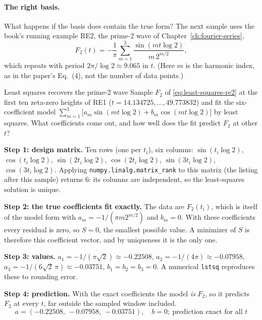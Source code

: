\paragraph{The right basis.} What happens if the basis does contain the true form? The next sample uses the book's running example RE2, the prime-2 wave of Chapter~\ref{ch:fourier-series},
\begin{equation}
F_2(t) = -\frac1\pi\sum_{m=1}^{3}\frac{\sin(mt\log2)}{m\,2^{m/2}} ,
\label{eq:least-squares-re2}
\end{equation}
which repeats with period $2\pi/\log 2\approx 9.065$ in $t$. (Here $m$ is the harmonic index, as in the paper's Eq.~(4), not the number of data points.)

\begin{sample}{Least squares recovers the prime-2 wave}
Sample $F_2$ of \cref{eq:least-squares-re2} at the first ten zeta-zero heights of RE1 ($t = 14.134725,\dots,49.773832$) and fit the six-coefficient model $\sum_{m=1}^3\bigl[a_m\sin(mt\log2) + b_m\cos(mt\log 2)\bigr]$ by least squares. What coefficients come out, and how well does the fit predict $F_2$ at other $t$?

\textbf{Step 1: design matrix.} Ten rows (one per $t_i$), six columns: $\sin(t_i\log2)$, $\cos(t_i\log2)$, $\sin(2t_i\log2)$, $\cos(2t_i\log 2)$, $\sin(3t_i\log 2)$, $\cos(3t_i\log2)$. Applying \texttt{numpy.linalg.matrix\_rank} to this matrix (the listing after this sample) returns $6$: its columns are independent, so the least-squares solution is unique.

\textbf{Step 2: the true coefficients fit exactly.} The data are $F_2(t_i)$, which is itself of the model form with $a_m = -1/(\pi m2^{m/2})$ and $b_m = 0$. With these coefficients every residual is zero, so $S = 0$, the smallest possible value. A minimizer of $S$ is therefore this coefficient vector, and by uniqueness it is the only one.

\textbf{Step 3: values.} $a_1 = -1/(\pi\sqrt2)\approx -0.22508$, $a_2 = -1/(4\pi)\approx-0.07958$, $a_3 = -1/(6\sqrt2\,\pi)\approx -0.03751$, $b_1 = b_2 = b_3 = 0$. A numerical \texttt{lstsq} reproduces these to rounding error.

\textbf{Step 4: prediction.} With the exact coefficients the model \emph{is} $F_2$, so it predicts $F_2$ at every $t$, far outside the sampled window included.
\[
\boxed{\,a = (-0.22508,\,-0.07958,\,-0.03751),\quad b = 0;\ \text{prediction exact for all } t\,}
\]
\end{sample}


